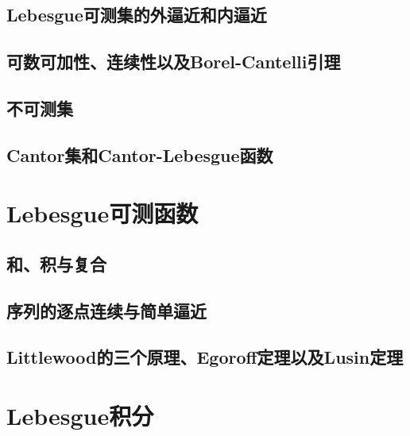 \documentclass[lang=cn,newtx,10pt,scheme=chinese]{../Template/elegantbook}
\begin{document}
\section{Lebesgue可测集的外逼近和内逼近}





\section{可数可加性、连续性以及Borel-Cantelli引理}




\section{不可测集}





\section{Cantor集和Cantor-Lebesgue函数}







\chapter{Lebesgue可测函数}

\section{和、积与复合}

\section{序列的逐点连续与简单逼近}

\section{Littlewood的三个原理、Egoroff定理以及Lusin定理}









\chapter{Lebesgue积分}
\end{document}
